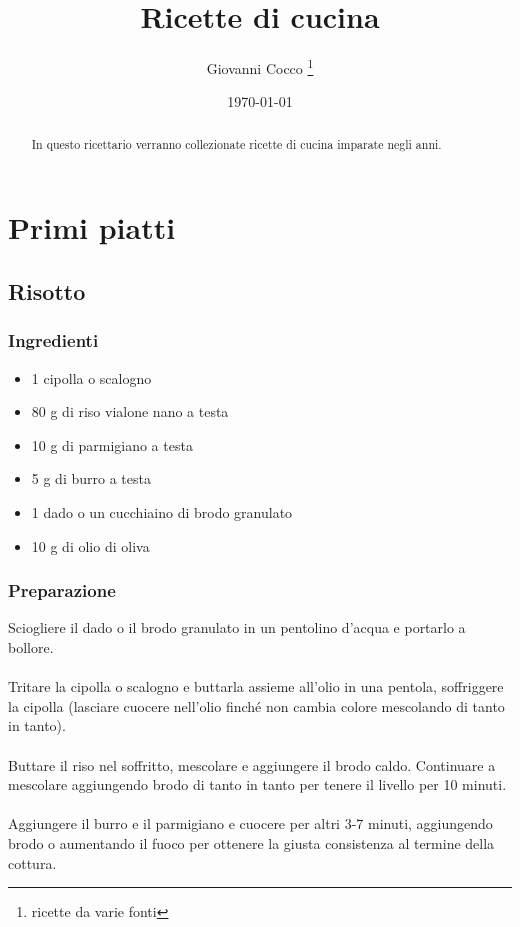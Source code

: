 \documentclass[12pt, a4paper]{article}
\title{Ricette di cucina}
\author{Giovanni Cocco \thanks{ricette da varie fonti}}
\date{\monthyeardate\today}
\begin{document}
\begin{titlepage}
\maketitle
\thispagestyle{empty}
\end{titlepage}

\begin{abstract}
In questo ricettario verranno collezionate ricette di cucina imparate negli anni.
\end{abstract}
\clearpage

\tableofcontents{}
\clearpage

\section{Primi piatti}

\subsection{Risotto}

\subsubsection{Ingredienti}
\begin{itemize}
\item	1 cipolla o scalogno
\item 	80 g di riso vialone nano a testa
\item 	10 g di parmigiano a testa
\item 	5 g di burro a testa
\item 	1 dado o un cucchiaino di brodo granulato
\item 	10 g di olio di oliva
\end{itemize}

\subsubsection{Preparazione}
	Sciogliere il dado o il brodo granulato in un pentolino d'acqua e
	portarlo a bollore.\\\\
	Tritare la cipolla o scalogno e buttarla assieme all'olio in una 
	pentola, soffriggere la cipolla (lasciare cuocere nell'olio finché 
	non cambia colore mescolando di tanto in tanto).\\\\
	Buttare il riso nel soffritto, mescolare e aggiungere il brodo caldo.
	Continuare a mescolare aggiungendo brodo di tanto in tanto per 
	tenere il livello per 10 minuti.\\\\
	Aggiungere il burro e il parmigiano e cuocere per altri 3-7 minuti,
	aggiungendo brodo o aumentando il fuoco per ottenere la giusta 
	consistenza al termine della cottura.
\end{document}
